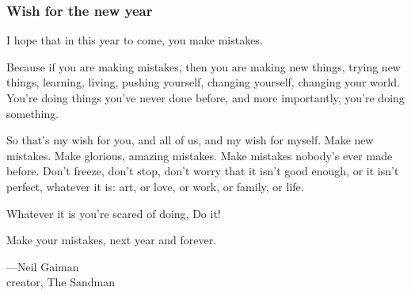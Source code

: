 \documentclass{beamer}
\newcommand{\bfr}[1]{\begin{frame}[fragile]\frametitle{{ #1 }}}
\begin{document}

\bfr{Wish for the new year}

\setlength{\parindent}{0em}
\setlength{\parskip}{1ex}
\sl

I hope that in this year to come, you make mistakes.

Because if you are making mistakes, then you are making new things,
trying new things, learning, living, pushing yourself, changing
yourself, changing your world. You're doing things you've never done
before, and more importantly, you're doing something.

So that's my wish for you, and all of us, and my wish for myself. Make
new mistakes. Make glorious, amazing mistakes. Make mistakes nobody's
ever made before. Don't freeze, don't stop, don't worry that it isn't
good enough, or it isn't perfect, whatever it is: art, or love, or
work, or family, or life.

Whatever it is you're scared of doing, Do it!

Make your mistakes, next year and forever.

\hfill ---Neil Gaiman
\\
\hfill creator, The Sandman

\end{frame}
\end{document}
